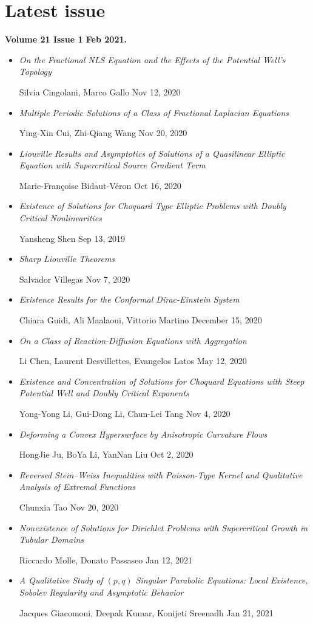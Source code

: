 \documentclass{book}
\numberwithin{equation}{section}
\begin{document}
\section{Latest issue}
\textbf{Volume 21 Issue 1 Feb 2021.}
\begin{itemize}
    \item \textit{On the Fractional NLS Equation and the Effects of the Potential Well's Topology}
    
    Silvia Cingolani, Marco Gallo Nov 12, 2020
    \item \textit{Multiple Periodic Solutions of a Class of Fractional Laplacian Equations}
    
    Ying-Xin Cui, Zhi-Qiang Wang Nov 20, 2020
    \item \textit{Liouville Results and Asymptotics of Solutions of a Quasilinear Elliptic Equation with Supercritical Source Gradient Term}
    
    Marie-Françoise Bidaut-Véron Oct 16, 2020
    \item \textit{Existence of Solutions for Choquard Type Elliptic Problems with Doubly Critical Nonlinearities}
    
    Yansheng Shen Sep 13, 2019
    \item \textit{Sharp Liouville Theorems}
    
     Salvador Villegas Nov 7, 2020
    \item \textit{Existence Results for the Conformal Dirac-Einstein System}
    
    Chiara Guidi, Ali Maalaoui, Vittorio Martino December 15, 2020
    \item \textit{On a Class of Reaction-Diffusion Equations with Aggregation}
    
    Li Chen, Laurent Desvillettes, Evangelos Latos May 12, 2020
    \item \textit{Existence and Concentration of Solutions for Choquard Equations with Steep Potential Well and Doubly Critical Exponents}
    
    Yong-Yong Li, Gui-Dong Li, Chun-Lei Tang Nov 4, 2020
    \item \textit{Deforming a Convex Hypersurface by Anisotropic Curvature Flows}
    
    HongJie Ju, BoYa Li, YanNan Liu Oct 2, 2020
    \item \textit{Reversed Stein–Weiss Inequalities with Poisson-Type Kernel and Qualitative Analysis of Extremal Functions}
    
    Chunxia Tao Nov 20, 2020
    \item \textit{Nonexistence of Solutions for Dirichlet Problems with Supercritical Growth in Tubular Domains}
    
    Riccardo Molle, Donato Passaseo Jan 12, 2021
    \item \textit{A Qualitative Study of $(p,q)$ Singular Parabolic Equations: Local Existence, Sobolev Regularity and Asymptotic Behavior}
    
    Jacques Giacomoni, Deepak Kumar, Konijeti Sreenadh Jan 21, 2021 
\end{itemize}
\end{document}
